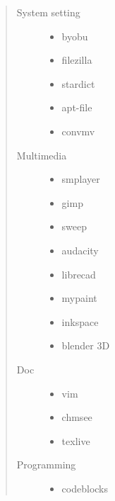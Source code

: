 \documentclass[letterpaper,10pt,english]{sphinxmanual}
\begin{document}
\label{index:ubuntu-s-documentation}\label{index:id1}\begin{quote}\begin{description}
\item[{System setting}] \leavevmode\begin{itemize}\setlength{\itemsep}{0pt}\setlength{\parskip}{0pt}
\item {} 
byobu

\item {} 
filezilla

\item {} 
stardict

\item {} 
apt-file

\item {} 
convmv

\end{itemize}

\item[{Multimedia}] \leavevmode\begin{itemize}\setlength{\itemsep}{0pt}\setlength{\parskip}{0pt}
\item {} 
smplayer

\item {} 
gimp

\item {} 
sweep

\item {} 
audacity

\item {} 
librecad

\item {} 
mypaint

\item {} 
inkspace

\item {} 
blender 3D

\end{itemize}

\item[{Doc}] \leavevmode\begin{itemize}\setlength{\itemsep}{0pt}\setlength{\parskip}{0pt}
\item {} 
vim

\item {} 
chmsee

\item {} 
texlive

\end{itemize}

\item[{Programming}] \leavevmode\begin{itemize}\setlength{\itemsep}{0pt}\setlength{\parskip}{0pt}
\item {} 
codeblocks


\end{itemize}
\end{description}
\end{quote}
\end{document}
